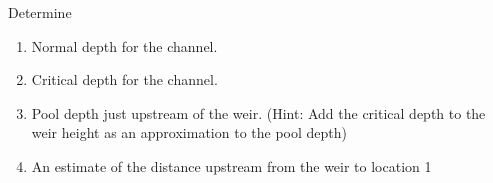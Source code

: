 \documentclass[12pt]{article}
\begin{document}
\begin{enumerate}
Determine
\begin{enumerate}
\item Normal depth for the channel.
\item Critical depth for the channel.
\item Pool depth just upstream of the weir. (Hint: Add the critical depth to the weir height as an approximation to the pool depth)
\item An estimate of the distance upstream from the weir to location 1 
\end{enumerate}
\clearpage






\end{enumerate}
\end{document}
